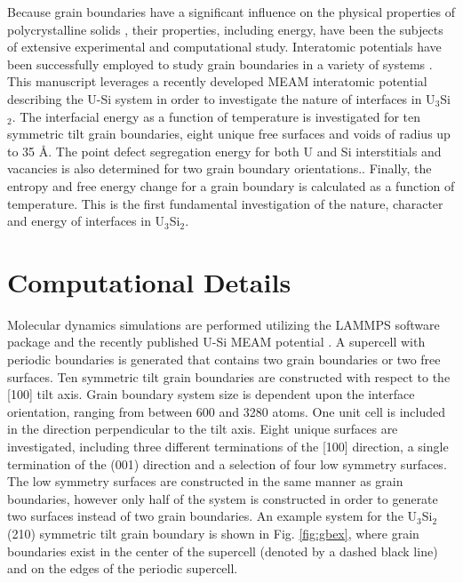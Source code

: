 \documentclass[review]{elsarticle}
\begin{document}
Because grain boundaries have a significant influence on the physical properties of polycrystalline solids \cite{brandon2010, harmer2010}, their properties, including energy, have been the subjects of extensive experimental and computational study. Interatomic potentials have been successfully employed to study grain boundaries in a variety of systems \cite{morita1997, wolf1989bcc1, wolf1990bcc2, ratanaphan2015, novoselov2014, tschopp2012probing, hahn2016}. This manuscript leverages a recently developed MEAM interatomic potential describing the U-Si system in order to investigate the nature of interfaces in U$_{3}$Si$_{2}$. The interfacial energy as a function of temperature is investigated for ten symmetric tilt grain boundaries, eight unique free surfaces and voids of radius up to 35 {\AA}. The point defect segregation energy for both U and Si interstitials and vacancies is also determined for two grain boundary orientations.. Finally, the entropy and free energy change for a grain boundary is calculated as a function of temperature. This is the first fundamental investigation of the nature, character and energy of interfaces in U$_{3}$Si$_{2}$. 

\section{Computational Details}
Molecular dynamics simulations are performed utilizing the LAMMPS \cite{plimpton1995} software package and the recently published U-Si MEAM potential \cite{beelerUSi}. A supercell with periodic boundaries is generated that contains two grain boundaries or two free surfaces. Ten symmetric tilt grain boundaries are constructed with respect to the [100] tilt axis. Grain boundary system size is dependent upon the interface orientation, ranging from between 600 and 3280 atoms. One unit cell is included in the direction perpendicular to the tilt axis. Eight unique surfaces are investigated, including three different terminations of the [100] direction, a single termination of the (001) direction and a selection of four low symmetry surfaces. The low symmetry surfaces are constructed in the same manner as grain boundaries, however only half of the system is constructed in order to generate two surfaces instead of two grain boundaries. An example system for the U$_{3}$Si$_{2}$ (210) symmetric tilt grain boundary is shown in Fig. \ref{fig:gbex}, where grain boundaries exist in the center of the supercell (denoted by a dashed black line) and on the edges of the periodic supercell.
\end{document}
